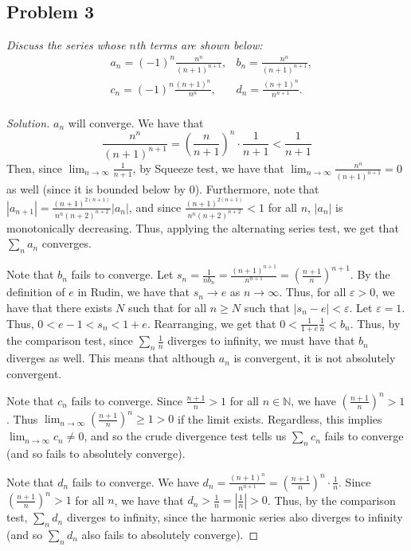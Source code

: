 \documentclass{article}
\newcommand{\N}{{\mathbb N}}
\newcommand{\ep}{{\varepsilon}}
\begin{document}
\subsection*{Problem 3}
{\it Discuss the series whose $n$th terms are shown below:
\begin{align*}
	&a_n = (-1)^n\frac{n^n}{(n+1)^{n+1}},
	&b_n = \frac{n^n}{(n+1)^{n+1}},\\
	&c_n = (-1)^n\frac{(n+1)^n}{n^n},
	&d_n = \frac{(n+1)^n}{n^{n+1}}.\\
\end{align*}

\begin{proof}[Solution]\let\qed\relax
	$a_n$ will converge.
	We have that
	\[
		\frac{n^n}{(n+1)^{n+1}} = \left(\frac{n}{n+1}\right)^n\cdot\frac{1}{n+1}
		< \frac{1}{n+1}
	\]
	Then, since $\lim_{n\to\infty} \frac{1}{n+1}$, by Squeeze test,
	we have that $\lim_{n\to\infty} \frac{n^n}{(n+1)^{n+1}} = 0$
	as well (since it is bounded below by $0$).
	Furthermore, note that $\left\lvert a_{n+1}\right\rvert = \frac{(n+1)^{2(n+1)}}{n^n(n+2)^{n+2}} \left\lvert a_{n}\right\rvert$,
	and since $\frac{(n+1)^{2(n+1)}}{n^n(n+2)^{n+2}} < 1$
	for all $n$, $|a_n|$ is monotonically decreasing.
	Thus, applying the alternating series test, we get that $\sum_n a_n$ converges.

	Note that $b_n$ fails to converge.
	Let $s_n = \frac{1}{nb_n} = \frac{(n+1)^{n+1}}{n^{n+1}} = \left(\frac{n+1}{n}\right)^{n+1}$.
	By the definition of $e$ in Rudin, we have that $s_n \to e$
	as $n \to \infty$.
	Thus, for all $\ep > 0$, we have that there exists $N$ such that
	for all $n \geq N$ such that $|s_n - e| < \ep$.
	Let $\ep = 1$. Thus, $0 < e - 1 < s_n < 1 + e$.
	Rearranging, we get that $0 < \frac{1}{1+e}\frac{1}{n} < b_n$.
	Thus, by the comparison test, since $\sum_n \frac{1}{n}$ diverges to infinity,
	we must have that $b_n$ diverges as well.
	This means that although $a_n$ is convergent, it is not absolutely convergent.

	Note that $c_n$ fails to converge.
	Since $\frac{n+1}{n} > 1$ for all $n \in \N$,
	we have $\left(\frac{n+1}{n}\right)^n > 1$.
	Thus $\lim_{n\to\infty} \left(\frac{n+1}{n}\right)^n \geq 1 > 0$
	if the limit exists.
	Regardless, this implies $\lim_{n\to\infty}c_n \neq 0$,
	and so the crude divergence test tells us $\sum_n c_n$ fails to converge
	(and so fails to absolutely converge).

	Note that $d_n$ fails to converge.
	We have $d_n = \frac{(n+1)^n}{n^{n+1}} = \left(\frac{n+1}{n}\right)^n\cdot\frac{1}{n}$.
	Since $\left(\frac{n+1}{n}\right)^n > 1$ for all $n$,
	we have that $d_n > \frac{1}{n} = \left\lvert \frac{1}{n}\right\rvert> 0$.
	Thus, by the comparison test, $\sum_n d_n$ diverges to infinity,
	since the harmonic series also diverges to infinity
	(and so $\sum_n d_n$ also fails to absolutely converge).
\end{proof}
\clearpage
~\clearpage

}
\end{document}
